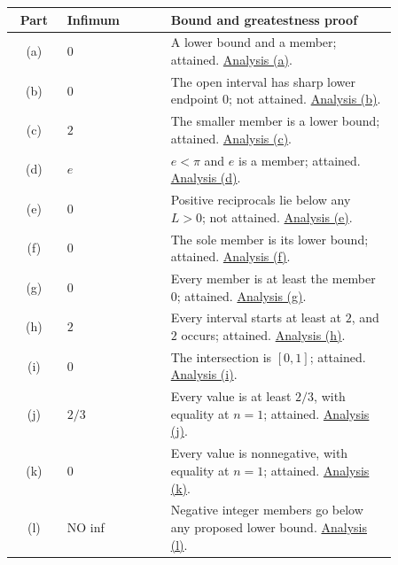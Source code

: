 \begin{center}
\begin{tabular}{@{}c@{\quad}p{0.27\linewidth}@{\quad}p{0.59\linewidth}@{}}
\toprule
Part&Infimum&Bound and greatestness proof\\ \midrule
(a)&$0$&A lower bound and a member; attained. \hyperref[bounds:a]{Analysis (a)}.\\
(b)&$0$&The open interval has sharp lower endpoint $0$; not attained. \hyperref[bounds:b]{Analysis (b)}.\\
(c)&$2$&The smaller member is a lower bound; attained. \hyperref[bounds:c]{Analysis (c)}.\\
(d)&$e$&$e<\pi$ and $e$ is a member; attained. \hyperref[bounds:d]{Analysis (d)}.\\
(e)&$0$&Positive reciprocals lie below any $L>0$; not attained. \hyperref[bounds:e]{Analysis (e)}.\\
(f)&$0$&The sole member is its lower bound; attained. \hyperref[bounds:f]{Analysis (f)}.\\
(g)&$0$&Every member is at least the member $0$; attained. \hyperref[bounds:g]{Analysis (g)}.\\
(h)&$2$&Every interval starts at least at $2$, and $2$ occurs; attained. \hyperref[bounds:h]{Analysis (h)}.\\
(i)&$0$&The intersection is $[0,1]$; attained. \hyperref[bounds:i]{Analysis (i)}.\\
(j)&$2/3$&Every value is at least $2/3$, with equality at $n=1$; attained. \hyperref[bounds:j]{Analysis (j)}.\\
(k)&$0$&Every value is nonnegative, with equality at $n=1$; attained. \hyperref[bounds:k]{Analysis (k)}.\\
(l)&NO inf&Negative integer members go below any proposed lower bound. \hyperref[bounds:l]{Analysis (l)}.\\
\bottomrule
\end{tabular}
\end{center}

